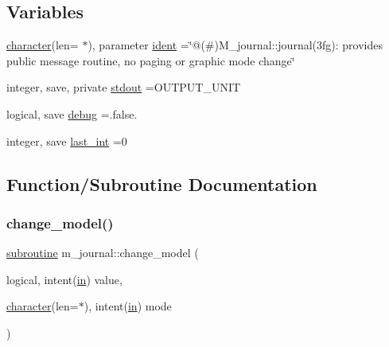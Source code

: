 \subsection*{Variables}
\begin{DoxyCompactItemize}
\item 
\hyperlink{option__stopwatch_83_8txt_abd4b21fbbd175834027b5224bfe97e66}{character}(len= $\ast$), parameter \hyperlink{namespacem__journal_a4e2131bb2d66050e0a9a37632579c9fc}{ident} =\char`\"{}@(\#)M\+\_\+journal\+::journal(3fg)\+: provides public message routine, no paging or graphic mode change\char`\"{}
\item 
integer, save, private \hyperlink{namespacem__journal_a664cf3fd85385b776d30ea589606ad1c}{stdout} =O\+U\+T\+P\+U\+T\+\_\+\+U\+N\+IT
\item 
logical, save \hyperlink{namespacem__journal_a6184fbcebdfa06f0a45ce4c699189b53}{debug} =.false.
\item 
integer, save \hyperlink{namespacem__journal_a47e8e34dc4072b04101027394d688519}{last\+\_\+int} =0
\end{DoxyCompactItemize}


\subsection{Function/\+Subroutine Documentation}
\mbox{\label{namespacem__journal_a358c4bd99444e0e946b3aaba5f278698}} 
\subsubsection{\texorpdfstring{change\+\_\+model()}{change\_model()}}
{\footnotesize\ttfamily \hyperlink{M__stopwatch_83_8txt_acfbcff50169d691ff02d4a123ed70482}{subroutine} m\+\_\+journal\+::change\+\_\+model (\begin{DoxyParamCaption}\item[{logical, intent(\hyperlink{M__journal_83_8txt_afce72651d1eed785a2132bee863b2f38}{in})}]{value,  }\item[{\hyperlink{option__stopwatch_83_8txt_abd4b21fbbd175834027b5224bfe97e66}{character}(len=$\ast$), intent(\hyperlink{M__journal_83_8txt_afce72651d1eed785a2132bee863b2f38}{in})}]{mode }\end{DoxyParamCaption})\hspace{0.3cm}{\ttfamily [private]}}



